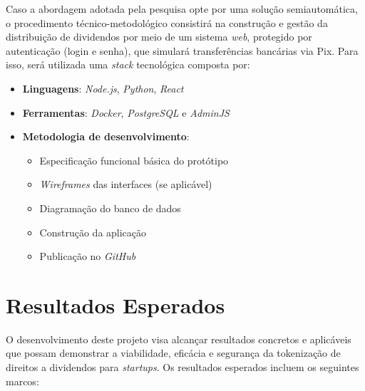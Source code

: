 \documentclass[12pt, a4paper, oneside, openright, chapter=TITLE]{abntex2}
\begin{document}
Caso a abordagem adotada pela pesquisa opte por uma solução semiautomática, o procedimento técnico-metodológico consistirá na construção e gestão da distribuição de dividendos por meio de um sistema \textit{web}, protegido por autenticação (login e senha), que simulará transferências bancárias via Pix. Para isso, será utilizada uma \textit{stack} tecnológica composta por:

\begin{itemize}
    \item \textbf{Linguagens}: \textit{Node.js}, \textit{Python}, \textit{React}
    \item \textbf{Ferramentas}: \textit{Docker}, \textit{PostgreSQL} e \textit{AdminJS}
    \item \textbf{Metodologia de desenvolvimento}:
    \begin{itemize}
        \item Especificação funcional básica do protótipo
        \item \textit{Wireframes} das interfaces (se aplicável)
        \item Diagramação do banco de dados
        \item Construção da aplicação
        \item Publicação no \textit{GitHub}
    \end{itemize}
\end{itemize}


\clearpage
\section{Resultados Esperados}
\hspace*{\parindent} O desenvolvimento deste projeto visa alcançar resultados concretos e aplicáveis que possam demonstrar a viabilidade, eficácia e segurança da tokenização de direitos a dividendos para \textit{startups}. Os resultados esperados incluem os seguintes marcos:
\end{document}
